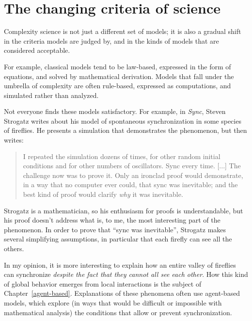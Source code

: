 \documentclass[12pt]{book}
\theoremstyle{exercise}
\begin{document}


\section{The changing criteria of science}

Complexity science is not just a different set of models; it is also a
gradual shift in the criteria models are judged by, and in the kinds
of models that are considered acceptable.


For example, classical models tend to be law-based, expressed in the
form of equations, and solved by mathematical derivation.  Models that
fall under the umbrella of complexity are often rule-based,
expressed as computations, and simulated rather than analyzed.

Not everyone finds these models satisfactory.  For example, in
{\em Sync}, Steven Strogatz writes about his model of spontaneous
synchronization in some species of fireflies.  He presents a
simulation that demonstrates the phenomenon, but then writes:


\begin{quote}
I repeated the simulation dozens of times, for other random
initial conditions and for other numbers of oscillators.  Sync
every time. [...] The challenge now was to prove it.  Only an
ironclad proof would demonstrate, in a way that no computer ever
could, that sync was inevitable; and the best kind of proof would
clarify {\em why} it was inevitable.
\end{quote}

Strogatz is a mathematician, so his enthusiasm for proofs is
understandable, but his proof doesn't address what is, to me, the most
interesting part of the phenomenon.  In order to prove that ``sync was
inevitable'', Strogatz makes several simplifying assumptions, in
particular that each firefly can see all the others.


In my opinion, it is more interesting to explain how an entire valley
of fireflies can synchronize {\em despite the fact that they cannot
  all see each other}.  How this kind of global behavior emerges from
local interactions is the subject of Chapter~\ref{agent-based}.
Explanations of these phenomena often use agent-based models, which
explore (in ways that would be difficult or impossible with
mathematical analysis) the conditions that allow or prevent
synchronization.
\end{document}
